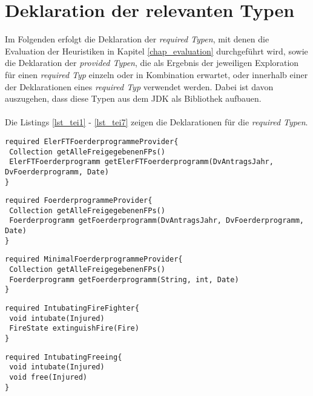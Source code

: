 \chapter{Deklaration der relevanten Typen}\label{app_evalTypes}
Im Folgenden erfolgt die Deklaration der \emph{required Typen}, mit denen die Evaluation der \Gls{Heuristik}en in Kapitel \ref{chap_evaluation} durchgeführt wird, sowie die Deklaration der \emph{provided Typen}, die als Ergebnis der jeweiligen Exploration für einen \emph{required Typ} einzeln oder in Kombination erwartet, oder innerhalb einer der Deklarationen eines \emph{required Typ} verwendet werden. Dabei ist davon auszugehen, dass diese Typen aus dem JDK als Bibliothek aufbauen.
\\\\
Die Listings \ref{lst_tei1} - \ref{lst_tei7} zeigen die Deklarationen für die \emph{required Typen}.
\begin{lstlisting}[style = dsl, caption = Deklaration von ElerFTFoerderprogrammeProvider, captionpos = b, label = lst_tei1]
required ElerFTFoerderprogrammeProvider{
 Collection getAlleFreigegebenenFPs()
 ElerFTFoerderprogramm getElerFTFoerderprogramm(DvAntragsJahr, DvFoerderprogramm, Date)
}
\end{lstlisting}
\begin{lstlisting}[style = dsl, caption = Deklaration von FoerderprogrammeProvider, captionpos = b, label = lst_tei2]
required FoerderprogrammeProvider{
 Collection getAlleFreigegebenenFPs()
 Foerderprogramm getFoerderprogramm(DvAntragsJahr, DvFoerderprogramm, Date)
}
\end{lstlisting}
\newpage
\begin{lstlisting}[style = dsl, caption = Deklaration von MinimalFoerderprogrammeProvider, captionpos = b, label = lst_tei3]
required MinimalFoerderprogrammeProvider{
 Collection getAlleFreigegebenenFPs()
 Foerderprogramm getFoerderprogramm(String, int, Date)
}
\end{lstlisting}
\begin{lstlisting}[style = dsl, caption = Deklaration von IntubatingFireFighter, captionpos = b, label = lst_tei4]
required IntubatingFireFighter{
 void intubate(Injured)
 FireState extinguishFire(Fire)
}
\end{lstlisting}
\begin{lstlisting}[style = dsl, caption = Deklaration von IntubatingFreeing, captionpos = b, label = lst_tei5]
required IntubatingFreeing{
 void intubate(Injured)
 void free(Injured)
}
\end{lstlisting}
